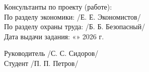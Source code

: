 \vspace{0.5cm}
\noindent Консультанты по проекту (работе): \\
\noindent По разделу экономики: \underline{\hspace{4cm}} /Е. Е. Экономистов/ \\
\noindent По разделу охраны труда: \underline{\hspace{4cm}} /Б. Б. Безопасный/ \\
\noindent Дата выдачи задания: «\underline{\hspace{0.5cm}}» \underline{\hspace{2cm}} 2026 г.

\vspace{0.5cm}
\noindent Руководитель \underline{\hspace{4cm}} /С. С. Сидоров/ \\
\noindent Студент \underline{\hspace{4cm}} /П. П. Петров/

\newpage